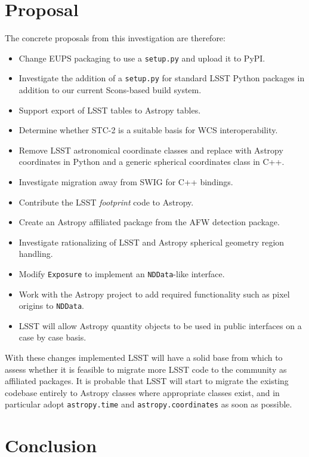 \documentclass[]{spie}  %
\begin{document}
\section{Proposal}

The concrete proposals from this investigation are therefore:

\begin{itemize}
\item Change EUPS packaging to use a \texttt{setup.py} and upload it to PyPI.
\item Investigate the addition of a \texttt{setup.py} for standard LSST Python packages in addition to our current Scons-based build system.
\item Support export of LSST tables to Astropy tables.
\item Determine whether STC-2 is a suitable basis for WCS interoperability.
\item Remove LSST astronomical coordinate classes and replace with Astropy coordinates in Python and a generic spherical coordinates class in C++.
\item Investigate migration away from SWIG for C++ bindings.
\item Contribute the LSST \emph{footprint} code to Astropy.
\item Create an Astropy affiliated package from the AFW detection package.
\item Investigate rationalizing of LSST and Astropy spherical geometry region handling.
\item Modify \texttt{Exposure} to implement an \texttt{NDData}-like interface.
\item Work with the Astropy project to add required functionality such as pixel origins to \texttt{NDData}.
\item LSST will allow Astropy quantity objects to be used in public interfaces on a case by case basis.

\end{itemize}

With these changes implemented LSST will have a solid base from which to assess whether it is feasible to migrate more LSST code to the community as affiliated packages.
It is probable that LSST will start to migrate the existing codebase entirely to Astropy classes where appropriate classes exist, and in particular adopt \texttt{astropy.time} and \texttt{astropy.coordinates} as soon as possible.

\section{Conclusion}
\end{document}
